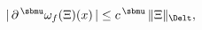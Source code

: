 \begin{equation} \label{5.1}
|\, \partial^{\,\sbmu}  \omega_f (\Xi) (x) \, | \leq c^{\,\sbmu} \, 
\| \Xi \|_\Delt,
\end{equation}

